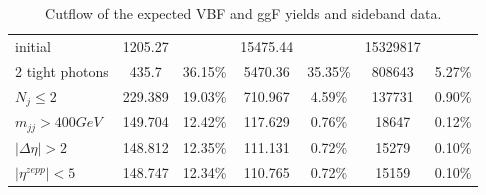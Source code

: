 \begin{table}[htbp]
\begin{center}
\begin{tabular}{l|cccccc}
initial                & 1205.27 &         & 15475.44 &         & 15329817 &        \\
2 tight photons        & 435.7   & 36.15\% & 5470.36  & 35.35\% & 808643   & 5.27\% \\
$N_{j}\le2$            & 229.389 & 19.03\% & 710.967  & 4.59\%  & 137731   & 0.90\% \\
$m_{jj}>400GeV$        & 149.704 & 12.42\% & 117.629  & 0.76\%  & 18647    & 0.12\% \\
$|\Delta\eta|>2$       & 148.812 & 12.35\% & 111.131  & 0.72\%  & 15279    & 0.10\% \\
$|\eta^{zepp}|<5$      & 148.747 & 12.34\% & 110.765  & 0.72\%  & 15159    & 0.10\% \\
\hline
\end{tabular}
\caption{Cutflow of the expected VBF and ggF yields and sideband data. }
\label{tab:cutflow}
\end{center}
\end{table}



